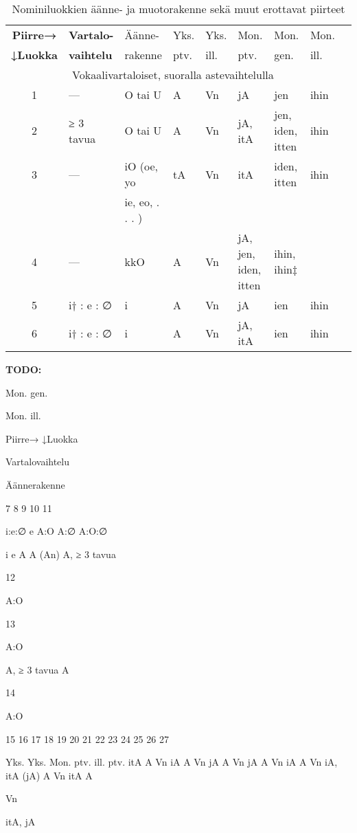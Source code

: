 \documentclass[free]{flammie}
\begin{document}
\begin{table}
        \caption{Nominiluokkien äänne- ja muotorakenne sekä
        muut erottavat piirteet}
    \begin{tabular}{|c||l|l|l|lll|l|l|}
        \hline
        \bf Piirre→ &
        \bf Vartalo- & Äänne- & Yks. & Yks. & Mon. & Mon. & Mon. \\
        \bf ↓Luokka &
        \bf vaihtelu & rakenne & ptv. & ill. & ptv.& gen. & ill. \\
        \hline
        \multicolumn{8}{|c|}{Vokaalivartaloiset, suoralla astevaihtelulla} \\
        \hline
        1 & — & O tai U & A & Vn & jA & jen & ihin \\
        2 & ≥ 3 tavua & O tai U & A & Vn & jA, itA & jen, iden, itten & ihin\\
        3 & — & iO (oe, yo & tA & Vn & itA & iden, itten & ihin \\
          &   & ie, eo, . . . ) &&  \\
        4 & — & kkO & A & Vn & jA, jen, iden, itten & ihin, ihin$\ddagger$ \\
        5 & i† : e : ∅ & i & A & Vn & jA & ien & ihin \\
        6 & i† : e : ∅ & i & A & Vn & jA, itA & ien & ihin \\
        \hline
    \end{tabular}
    \bf TODO:

Mon.
gen.

Mon.
ill.




Piirre→
↓Luokka

Vartalovaihtelu

Äännerakenne

7
8
9
10
11

i:e:∅
e
A:O
A:∅
A:O:∅

i
e
A
A (An)
A,
≥ 3 tavua

12

A:O

13

A:O

A,
≥ 3 tavua
A

14

A:O

15
16
17
18
19
20
21
22
23
24
25
26
27

Yks. Yks. Mon.
ptv. ill.
ptv.
itA
A
Vn
iA
A
Vn
jA
A
Vn
jA
A
Vn
iA
A
Vn
iA,
itA
(jA)
A
Vn
itA
A

Vn

itA,
jA


\end{table}
\end{document}
